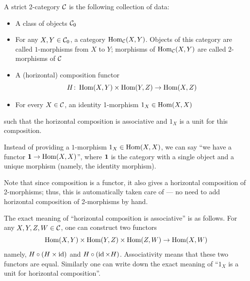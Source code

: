 \begin{definition}\label{d:2-cat-strict}
  A strict 2-category $\mathcal{C}$ is the following collection of data:
  \begin{itemize}
    \item A class of objects $\mathcal{C}_0$
    \item For any $X, Y\in \mathcal{C}_0$, a category $\operatorname{Hom}_{\mathcal{C}}(X,Y)$. Objects of
      this category are called $1$-morphisms from $X$ to $Y$; morphisms
      of $\operatorname{Hom}_{\mathcal{C}}(X,Y)$ are called $2$-morphisms of $\mathcal{C}$
    \item A (horizontal) composition functor
      $$
        H\colon \operatorname{Hom}(X,Y)\times \operatorname{Hom}(Y,Z)\to \operatorname{Hom}(X,Z)
      $$
    \item For every $X\in \mathcal{C}$, an identity 1-morphism $1_X\in \operatorname{Hom}(X,X)$
  \end{itemize}
  such that the horizontal composition is associative and $1_X$ is a unit
  for this composition.
\end{definition}
Instead of providing a $1$-morphism $1_X\in \operatorname{Hom}(X,X)$, we can say
``we have a functor $\mathbf{1}\to\operatorname{Hom}(X,X)$'', where $\mathbf{1}$ is the category
with a single object and a unique morphism (namely, the identity morphism).

Note that since composition is a functor, it also gives a horizontal
composition of 2-morphisms; thus, this is automatically taken care of --- no
need to add horizontal composition of 2-morphisms by hand.

The exact meaning of ``horizontal composition is associative'' is as follows.
For any $X,Y,Z,W\in \mathcal{C}$, one can construct two functors
$$
\operatorname{Hom}(X,Y)\times \operatorname{Hom}(Y,Z)\times\operatorname{Hom}(Z,W)\to \operatorname{Hom}(X,W)
$$
namely, $H\circ (H\times \operatorname{id})$ and $H\circ (\operatorname{id} \times H)$. Associativity
means that these two functors are equal. Similarly one can write down the exact
meaning of ``$1_X$ is a unit for horizontal composition''.

